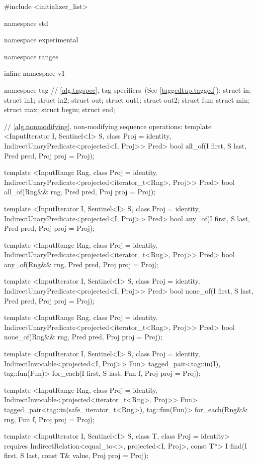 \begin{codeblock}
#include <initializer_list>

namespace std { namespace experimental { namespace ranges { inline namespace v1 {
  namespace tag {
    // \ref{alg.tagspec}, tag specifiers~(See \ref{taggedtup.tagged}):
    struct in;
    struct in1;
    struct in2;
    struct out;
    struct out1;
    struct out2;
    struct fun;
    struct min;
    struct max;
    struct begin;
    struct end;
  }

  // \ref{alg.nonmodifying}, non-modifying sequence operations:
  template <InputIterator I, Sentinel<I> S, class Proj = identity,
      IndirectUnaryPredicate<projected<I, Proj>> Pred>
    bool all_of(I first, S last, Pred pred, Proj proj = Proj{});

  template <InputRange Rng, class Proj = identity,
      IndirectUnaryPredicate<projected<iterator_t<Rng>, Proj>> Pred>
    bool all_of(Rng&& rng, Pred pred, Proj proj = Proj{});

  template <InputIterator I, Sentinel<I> S, class Proj = identity,
      IndirectUnaryPredicate<projected<I, Proj>> Pred>
    bool any_of(I first, S last, Pred pred, Proj proj = Proj{});

  template <InputRange Rng, class Proj = identity,
      IndirectUnaryPredicate<projected<iterator_t<Rng>, Proj>> Pred>
    bool any_of(Rng&& rng, Pred pred, Proj proj = Proj{});

  template <InputIterator I, Sentinel<I> S, class Proj = identity,
      IndirectUnaryPredicate<projected<I, Proj>> Pred>
    bool none_of(I first, S last, Pred pred, Proj proj = Proj{});

  template <InputRange Rng, class Proj = identity,
      IndirectUnaryPredicate<projected<iterator_t<Rng>, Proj>> Pred>
    bool none_of(Rng&& rng, Pred pred, Proj proj = Proj{});

  template <InputIterator I, Sentinel<I> S, class Proj = identity,
      IndirectInvocable<projected<I, Proj>> Fun>
    tagged_pair<tag::in(I), tag::fun(Fun)>
      for_each(I first, S last, Fun f, Proj proj = Proj{});

  template <InputRange Rng, class Proj = identity,
      IndirectInvocable<projected<iterator_t<Rng>, Proj>> Fun>
    tagged_pair<tag::in(safe_iterator_t<Rng>), tag::fun(Fun)>
      for_each(Rng&& rng, Fun f, Proj proj = Proj{});

  template <InputIterator I, Sentinel<I> S, class T, class Proj = identity>
    requires IndirectRelation<equal_to<>, projected<I, Proj>, const T*>
    I find(I first, S last, const T& value, Proj proj = Proj{});

}}}}
\end{codeblock}
